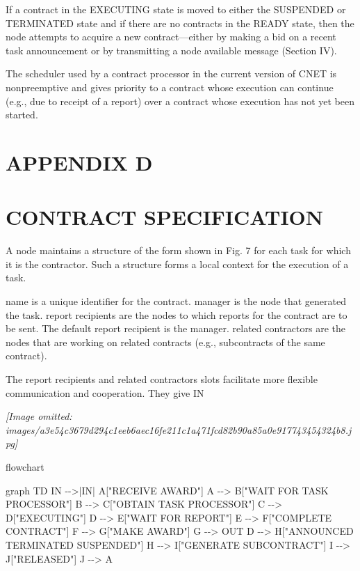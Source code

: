 \documentclass[
]{article}
\newenvironment{Shaded}{}{}
\newcommand{\NormalTok}[1]{#1}
\begin{document}
If a contract in the EXECUTING state is moved to either the SUSPENDED or
TERMINATED state and if there are no contracts in the READY state, then
the node attempts to acquire a new contract---either by making a bid on
a recent task announcement or by transmitting a node available message
(Section IV).

The scheduler used by a contract processor in the current version of
CNET is nonpreemptive and gives priority to a contract whose execution
can continue (e.g., due to receipt of a report) over a contract whose
execution has not yet been started.

\section{APPENDIX D}\label{appendix-d}

\section{CONTRACT SPECIFICATION}\label{contract-specification}

A node maintains a structure of the form shown in Fig. 7 for each task
for which it is the contractor. Such a structure forms a local context
for the execution of a task.

name is a unique identifier for the contract. manager is the node that
generated the task. report recipients are the nodes to which reports for
the contract are to be sent. The default report recipient is the
manager. related contractors are the nodes that are working on related
contracts (e.g., subcontracts of the same contract).

The report recipients and related contractors slots facilitate more
flexible communication and cooperation. They give IN

\textit{[Image omitted: images/a3e54c3679d294c1eeb6aec16fe211c1a471fcd82b90a85a0e917743454324b8.jpg]}

flowchart

\begin{Shaded}
\begin{Highlighting}[]
\NormalTok{graph TD}
\NormalTok{    IN {-}{-}\textgreater{}|IN| A["RECEIVE AWARD"]}
\NormalTok{    A {-}{-}\textgreater{} B["WAIT FOR TASK PROCESSOR"]}
\NormalTok{    B {-}{-}\textgreater{} C["OBTAIN TASK PROCESSOR"]}
\NormalTok{    C {-}{-}\textgreater{} D["EXECUTING"]}
\NormalTok{    D {-}{-}\textgreater{} E["WAIT FOR REPORT"]}
\NormalTok{    E {-}{-}\textgreater{} F["COMPLETE CONTRACT"]}
\NormalTok{    F {-}{-}\textgreater{} G["MAKE AWARD"]}
\NormalTok{    G {-}{-}\textgreater{} OUT}
\NormalTok{    D {-}{-}\textgreater{} H["ANNOUNCED TERMINATED SUSPENDED"]}
\NormalTok{    H {-}{-}\textgreater{} I["GENERATE SUBCONTRACT"]}
\NormalTok{    I {-}{-}\textgreater{} J["RELEASED"]}
\NormalTok{    J {-}{-}\textgreater{} A}
\end{Highlighting}
\end{Shaded}
\end{document}
